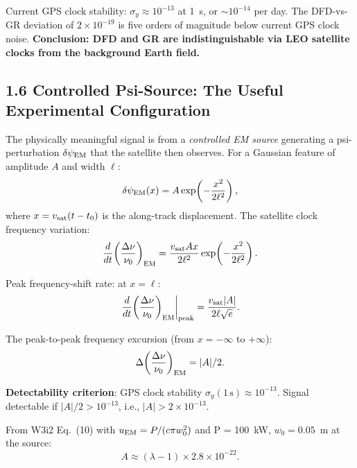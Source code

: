 \documentclass[11pt,twocolumn]{article}
\newcommand{\dpsi}{\delta\psi}
\newcommand{\lam}{\lambda}
\begin{document}
Current GPS clock stability: $\sigma_y \approx 10^{-13}$ at 1~s, or
$\sim10^{-14}$ per day. The DFD-vs-GR deviation of $2\times10^{-19}$ is
five orders of magnitude below current GPS clock noise. \textbf{Conclusion:
DFD and GR are indistinguishable via LEO satellite clocks from the
background Earth field.}

\subsection*{1.6 Controlled Psi-Source: The Useful Experimental Configuration}

The physically meaningful signal is from a \emph{controlled EM source}
generating a psi-perturbation $\dpsi_{\rm EM}$ that the satellite then
observes. For a Gaussian feature of amplitude $A$ and width $\ell$:
\begin{equation}
\dpsi_{\rm EM}(x) = A\exp\!\left(-\frac{x^2}{2\ell^2}\right),
\label{eq:gaussian_feature}
\end{equation}
where $x = v_{\rm sat}(t - t_0)$ is the along-track displacement. The
satellite clock frequency variation:
\begin{equation}
\frac{d}{dt}\!\left(\frac{\Delta\nu}{\nu_0}\right)_{\rm EM}
= \frac{v_{\rm sat}Ax}{2\ell^2}
  \exp\!\left(-\frac{x^2}{2\ell^2}\right).
\label{eq:gaussian_signal}
\end{equation}

Peak frequency-shift rate: at $x = \ell$:
\begin{equation}
\left.\frac{d}{dt}\!\left(\frac{\Delta\nu}{\nu_0}\right)_{\rm EM}\right|_{\rm peak}
= \frac{v_{\rm sat}|A|}{2\ell\sqrt{e}}.
\label{eq:peak_rate}
\end{equation}

The peak-to-peak frequency excursion (from $x=-\infty$ to $+\infty$):
\begin{equation}
\Delta\!\left(\frac{\Delta\nu}{\nu_0}\right)_{\rm EM} = |A|/2.
\label{eq:pp_excursion}
\end{equation}

\textbf{Detectability criterion}: GPS clock stability $\sigma_y(1\,\text{s})
\approx 10^{-13}$. Signal detectable if $|A|/2 > 10^{-13}$, i.e.,
$|A| > 2\times10^{-13}$.

From W3i2 Eq.~(10) with $u_{\rm EM} = P/(c\pi w_0^2)$ and P = 100~kW,
$w_0 = 0.05$~m at the source:
\begin{equation}
A \approx (\lam-1)\times2.8\times10^{-22}.
\label{eq:A_from_lambda}
\end{equation}
\end{document}
